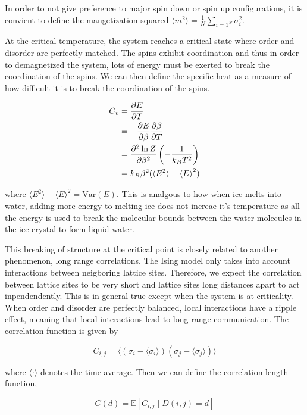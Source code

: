 \documentclass{article}
\begin{document}
In order to not give preference to major spin down or spin up configurations, it is convient to define the mangetization squared
$\langle m^2 \rangle = \frac1N \sum_{i=1^N} \sigma_i^2$.

At the critical temperature, the system reaches a critical state where order and disorder are perfectly matched.
The spins exhibit coordination and thus in order to demagnetized the system, lots of energy must be exerted to break the coordination of the spins.
We can then define the specific heat as a measure of how difficult it is to break the coordination of the spins.

\begin{align}
    C_v &= \pdv{E}{T} \\
    &= -\pdv{E}{\beta} \pdv{\beta}{T} \\
    &= \pdv[2]{\ln Z}{\beta} \left( - \frac{1}{k_B T^2} \right) \\
    &= k_B \beta^2 ( \langle E^2 \rangle - { \langle E \rangle }^2 )
\end{align}

where $\langle E^2 \rangle - { \langle E \rangle }^2 = \mathrm{Var}(E)$. This is analgous to how when ice melts into water, 
adding more energy to melting ice does not increae it's temperature as all the energy is used to break the molecular bounds between 
the water molecules in the ice crystal to form liquid water. 

This breaking of structure at the critical point is closely related to another phenomenon, long range correlations. The Ising model only takes into account
interactions between neigboring lattice sites. Therefore, we expect the correlation between lattice sites to be very short and lattice sites
long distances apart to act inpendendently. This is in general true except when the system is at criticality. When order and disorder
are perfectly balanced, local interactions have a ripple effect, meaning that local interactions lead to long range communication. The correlation function is given by

\begin{equation}
    C_{i,j} = \langle (\sigma_i - \langle \sigma_i \rangle)(\sigma_j - \langle \sigma_j \rangle) \rangle
\end{equation}

where $\langle \cdot \rangle$ denotes the time average. Then we can define the correlation length function,

\begin{equation}
    C(d) = \mathbb{E} \left[ C_{i,j} \mid D(i,j) = d \right]
\end{equation}
\end{document}
